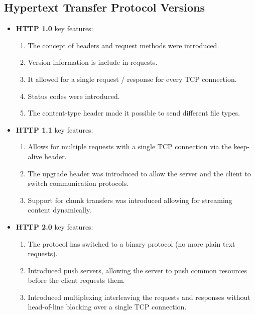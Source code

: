 \documentclass[16pt]{article}
\begin{document}
    \subsection*{Hypertext Transfer Protocol Versions}
    \begin{itemize}
        \item \textbf{HTTP 1.0} key features:
        \begin{enumerate}
            \item The concept of headers and request methods were introduced.
            \item Version information is include in requests.
            \item It allowed for a single request / response for every TCP connection.
            \item Status codes were introduced.
            \item The content-type header made it possible to send different file types.
        \end{enumerate}
        \item \textbf{HTTP 1.1} key features:
        \begin{enumerate}
            \item Allows for multiple requests with a single TCP connection via the keep-alive header.
            \item The upgrade header was introduced to allow the server and the client to switch communication protocols.
            \item Support for chunk transfers was introduced allowing for streaming content dynamically.
        \end{enumerate}
        \item \textbf{HTTP 2.0} key features:
        \begin{enumerate}
            \item The protocol has switched to a binary protocol (no more plain text requests).
            \item Introduced push servers, allowing the server to push common resources before the client requests them.
            \item Introduced multiplexing interleaving the requests and responses without head-of-line blocking over a single TCP connection.
        \end{enumerate}
    \end{itemize}
\end{document}

